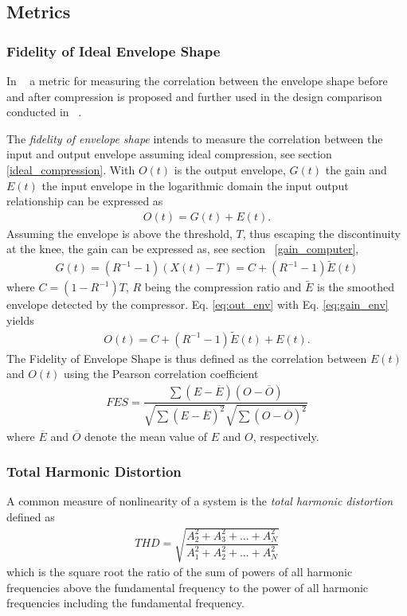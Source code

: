 \documentclass[../main2.tex]{subfiles}
\begin{document}
\subsection{Metrics}
\subsubsection{Fidelity of Ideal Envelope Shape} \label{fes}
In ~\cite{stone2007quantifying} a metric for measuring the correlation between the envelope shape before and after compression is proposed and further used in the design comparison conducted in ~\cite{reiss2012tutorial}. 

The \emph{fidelity of envelope shape} intends to measure the correlation between the input and output envelope assuming ideal compression, see section \ref{ideal_compression}.
With $O(t)$ is the output envelope, $G(t)$ the gain and $E(t)$ the input envelope in the logarithmic domain the input output relationship can be expressed as
 \begin{align}
O(t) = G(t) + E(t).
\label{eq:out_env}
\end{align}
Assuming the envelope is above the threshold, $T$, thus escaping the discontinuity at the knee, the gain can be expressed as, see section ~\ref{gain_computer},
\begin{align}
G(t) = (R^{-1}-1)(X(t)-T) = C + (R^{-1}-1)\tilde{E}(t)
\label{eq:gain_env}
\end{align}
where $C = (1-R^{-1})T$, $R$ being the compression ratio and $\tilde{E}$ is the smoothed envelope detected by the compressor. Eq. \eqref{eq:out_env} with Eq. \eqref{eq:gain_env} yields
\begin{align}
O(t) = C + (R^{-1}-1)\tilde{E}(t) + E(t).
\end{align}
The Fidelity of Envelope Shape is thus defined as the correlation between $E(t)$ and $O(t)$ using the Pearson correlation coefficient
\begin{align}
FES = \dfrac{\sum(E-\overline{E})(O-\overline{O})}{\sqrt{\sum(E-\overline{E})^2}\sqrt{\sum(O-\overline{O})^2}}
\end{align}
where $\overline{E}$ and $\overline{O}$ denote the mean value of $E$ and $O$, respectively.
\subsubsection{Total Harmonic Distortion}
A common measure of nonlinearity of a system is the \emph{total harmonic distortion} defined as \cite{dafx02}
\begin{align}
THD = \sqrt{\dfrac{A_2^2 + A_3^2 + ... + A_N^2}{A_1^2 + A_2^2 + ... + A_N^2}}
\end{align}
which is the square root the ratio of the sum of powers of all harmonic frequencies above the fundamental frequency to the power of all harmonic frequencies including the fundamental frequency.
\end{document}
